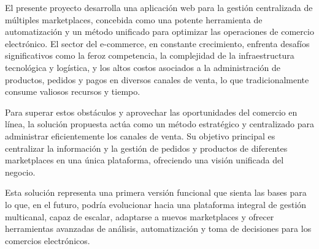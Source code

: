 El presente proyecto desarrolla una aplicación web para la gestión centralizada de múltiples marketplaces, concebida como una potente herramienta de automatización y un método unificado para optimizar las operaciones de comercio electrónico. El sector del e-commerce, en constante crecimiento, enfrenta desafíos significativos como la feroz competencia, la complejidad de la infraestructura tecnológica y logística, y los altos costos asociados a la administración de productos, pedidos y pagos en diversos canales de venta, lo que tradicionalmente consume valiosos recursos y tiempo.

Para superar estos obstáculos y aprovechar las oportunidades del comercio en línea, la solución propuesta actúa como un método estratégico y centralizado para administrar eficientemente los canales de venta. Su objetivo principal es centralizar la información y la gestión de pedidos y productos de diferentes marketplaces en una única plataforma, ofreciendo una visión unificada del negocio.

Esta solución representa una primera versión funcional que sienta las bases para lo que, en el futuro, podría evolucionar hacia una plataforma integral de gestión multicanal, capaz de escalar, adaptarse a nuevos marketplaces y ofrecer herramientas avanzadas de análisis, automatización y toma de decisiones para los comercios electrónicos.